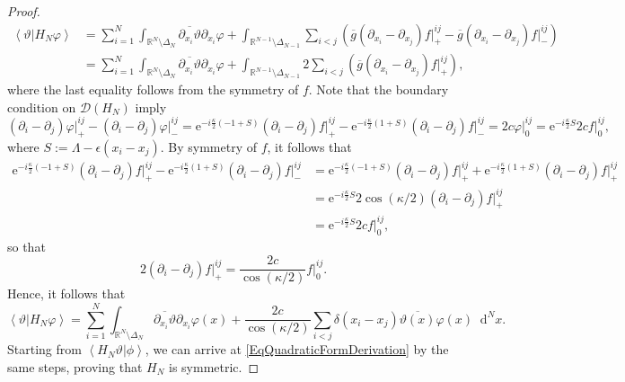 \documentclass[a4paper,11pt]{article}
\newcommand{\euler}[1]{\text{e}^{#1}}
\renewcommand{\braket}[1]{\left\langle#1\right\rangle}
\newcommand*\diff{\mathop{}\!\mathrm{d}}
\newcommand{\R}{\mathbb{R}}
\numberwithin{equation}{section}
\begin{document}
\begin{proof}
				\begin{equation}
				\begin{aligned}
				\braket{\vartheta\vert H_N \varphi}&=\sum_{i=1}^{N}\int_{\R^N\setminus\Delta_N}\overline{\partial_{x_i}\vartheta}\partial_{x_i}\varphi+\int_{\R^{N-1}\setminus\Delta_{N-1}}\sum_{i< j}\left(\overline{g}(\partial_{x_i}-\partial_{x_j})f\vert^{ij}_+-\overline{g}(\partial_{x_i}-\partial_{x_j})f\vert^{ij}_-\right)\\
				&=\sum_{i=1}^{N}\int_{\R^N\setminus\Delta_N}\overline{\partial_{x_i}\vartheta}\partial_{x_i}\varphi+\int_{\R^{N-1}\setminus\Delta_{N-1}}2\sum_{i< j}\left(\overline{g}(\partial_{x_i}-\partial_{x_j})f\vert^{ij}_+\right),
				\end{aligned}
				\end{equation}
				where the last equality follows from the symmetry of $f$. Note that the boundary condition on $ \mathcal{D}(H_N) $ imply \begin{equation}
				(\partial_i-\partial_j)\varphi\rvert^{ij}_+-(\partial_i-\partial_j)\varphi\rvert^{ij}_-=\euler{-i\frac{\kappa}{2}\left(-1+S\right)}(\partial_i-\partial_j)f\rvert^{ij}_+-\euler{-i\frac{\kappa}{2}\left(1+S\right)}(\partial_i-\partial_j)f\rvert^{ij}_-=2c \varphi\rvert^{ij}_0=\euler{-i\frac{\kappa}{2}S}2c f\rvert^{ij}_0,
				\end{equation}
				where $ S:=\Lambda-\epsilon(x_i-x_j) $. By symmetry of $ f $, it follows that \begin{equation}
				\begin{aligned}
				\euler{-i\frac{\kappa}{2}\left(-1+S\right)}(\partial_i-\partial_j)f\rvert^{ij}_+-\euler{-i\frac{\kappa}{2}\left(1+S\right)}(\partial_i-\partial_j)f\rvert^{ij}_-
				&=\euler{-i\frac{\kappa}{2}\left(-1+S\right)}(\partial_i-\partial_j)f\rvert^{ij}_++\euler{-i\frac{\kappa}{2}\left(1+S\right)}(\partial_i-\partial_j)f\rvert^{ij}_+\\
				&=\euler{-i\frac{\kappa}{2}S}2\cos(\kappa/2)(\partial_i-\partial_j)f\rvert^{ij}_+\\
				&=\euler{-i\frac{\kappa}{2}S}2c f\rvert^{ij}_0,
				\end{aligned}
				\end{equation}
				so that \begin{equation}
				2(\partial_i-\partial_j)f\rvert^{ij}_+=\frac{2c}{\cos(\kappa/2)}f\rvert^{ij}_0. 
				\end{equation}
				Hence, it follows that \begin{equation}\label{EqQuadraticFormDerivation}
				\braket{\vartheta\vert H_N \varphi}=\sum_{i=1}^{N}\int_{{\R^N\setminus\Delta_N}}\overline{\partial_{x_i}\vartheta} \partial_{x_i}\varphi(x)+\frac{2c}{\cos(\kappa/2)}\sum_{i<j} \delta(x_i-x_j)\overline{\vartheta(x)}\varphi(x)\diff^{N}x.
				\end{equation}
				Starting from $ \braket{H_N\vartheta\vert \phi} $, we can arrive at \eqref{EqQuadraticFormDerivation} by the same steps, proving that $ H_N $ is symmetric. 	
			\end{proof}
\end{document}
